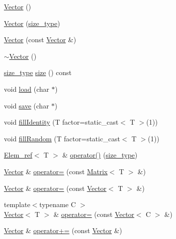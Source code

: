 \begin{DoxyCompactItemize}
\item 
\hyperlink{classlmx_1_1Vector_a39d6069675db4ecfc1ab81d440da759a}{Vector} ()
\item 
\hyperlink{classlmx_1_1Vector_ae633c7cc178fc379abf6bea2415d6f03}{Vector} (\hyperlink{lmx__mat__data_8h_a49b489a408a211a90e766329c0732d7b}{size\-\_\-type})
\item 
\hyperlink{classlmx_1_1Vector_a4edc1cac2c4cd6d3791280edabd89029}{Vector} (const \hyperlink{classlmx_1_1Vector}{Vector} \&)
\item 
\hyperlink{classlmx_1_1Vector_afd524fac19e6d3d69db5198ffe2952b0}{$\sim$\-Vector} ()
\item 
\hyperlink{lmx__mat__data_8h_a49b489a408a211a90e766329c0732d7b}{size\-\_\-type} \hyperlink{classlmx_1_1Vector_a35fcd4c3141584163b295f0f28102e57}{size} () const 
\item 
void \hyperlink{classlmx_1_1Vector_a2133415453d3657fc61f02bc231021e2}{load} (char $\ast$)
\item 
void \hyperlink{classlmx_1_1Vector_ad7e220c625fcff2048c58a0c8b4f36f3}{save} (char $\ast$)
\item 
void \hyperlink{classlmx_1_1Vector_ae2325ba0d5e79c6593708ffd3b7e4684}{fill\-Identity} (T factor=static\-\_\-cast$<$ T $>$(1))
\item 
void \hyperlink{classlmx_1_1Vector_a4dca7d80697c09308f709ec3889b8eb6}{fill\-Random} (T factor=static\-\_\-cast$<$ T $>$(1))
\item 
\hyperlink{classlmx_1_1Elem__ref}{Elem\-\_\-ref}$<$ T $>$ \& \hyperlink{classlmx_1_1Vector_ac65c4ff5646cf0245dfdb5d7ba97f2b5}{operator()} (\hyperlink{lmx__mat__data_8h_a49b489a408a211a90e766329c0732d7b}{size\-\_\-type})
\item 
\hyperlink{classlmx_1_1Vector}{Vector} \& \hyperlink{classlmx_1_1Vector_af3492ad5c3c02796b4e6a17db71f828e}{operator=} (const \hyperlink{classlmx_1_1Matrix}{Matrix}$<$ T $>$ \&)
\item 
\hyperlink{classlmx_1_1Vector}{Vector} \& \hyperlink{classlmx_1_1Vector_a84e014345158da7a6b89a4879c8086c4}{operator=} (const \hyperlink{classlmx_1_1Vector}{Vector}$<$ T $>$ \&)
\item 
{\footnotesize template$<$typename C $>$ }\\\hyperlink{classlmx_1_1Vector}{Vector}$<$ T $>$ \& \hyperlink{classlmx_1_1Vector_a90f36c22fe1a94babc3d077912fd9f61}{operator=} (const \hyperlink{classlmx_1_1Vector}{Vector}$<$ C $>$ \&)
\item 
\hyperlink{classlmx_1_1Vector}{Vector} \& \hyperlink{classlmx_1_1Vector_a2c0a2fdbc85318a0b949d67bbae3c035}{operator+=} (const \hyperlink{classlmx_1_1Vector}{Vector} \&)

\end{DoxyCompactItemize}

